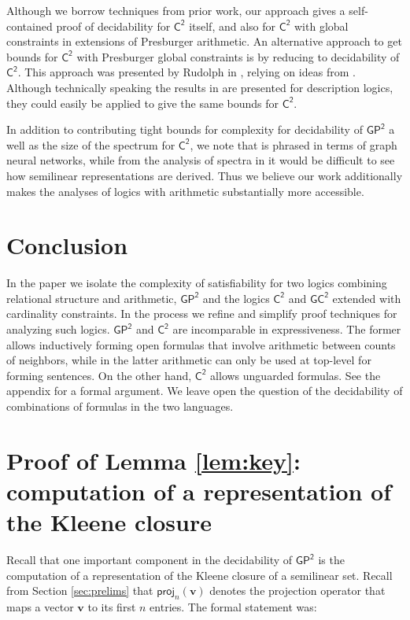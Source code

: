 \documentclass[10pt,a4paper]{article}
\theoremstyle{definition}
\theoremstyle{remark}
\newcommand{\bfv}{\mathbf{v}}
\newcommand{\Ctwo}    {\mathsf{C^2}}
\newcommand{\GCtwo}   {\mathsf{GC^2}}
\newcommand{\GPtwo}   {\mathsf{GP^2}}
\newcommand{\projp}[2]     {\mathsf{proj}_{ #1 }\left( #2 \right)}
\begin{document}
Although we borrow techniques from prior work, our approach gives a self-contained proof of decidability for $\Ctwo$ itself, and also for $\Ctwo$ with global constraints in extensions of Presburger arithmetic. An alternative approach to get bounds for $\Ctwo$ with Presburger global constraints is by reducing to decidability of $\Ctwo$.
This approach was presented by Rudolph in \cite{rudolphcardinality}, relying on ideas from \cite{baadercardinality}. Although technically speaking the results in \cite{rudolphcardinality} are presented for description logics, they could easily be applied to give the same bounds for $\Ctwo$.

In addition to contributing tight bounds for complexity for decidability of $\GPtwo$ a well as the size of the spectrum  for $\Ctwo$, we note that \cite{usicalp} is phrased in terms of graph neural networks, while from the analysis of spectra in \cite{tonyeryk,ultimatelyperiodic} it would be difficult to see how semilinear representations are derived. Thus we believe our work additionally makes the analyses of logics with arithmetic substantially more accessible.


\section{Conclusion} \label{sec:conc}

In the paper we isolate the complexity of satisfiability for two logics combining relational
structure and  arithmetic, $\GPtwo$ and 
the logics $\Ctwo$ and $\GCtwo$ extended with cardinality constraints. In the process we refine and
simplify proof techniques for analyzing such logics.  $\GPtwo$ and $\Ctwo$ are incomparable in expressiveness. The former allows inductively forming open formulas that involve arithmetic between counts of neighbors, while in the latter arithmetic can only be used at top-level for forming sentences. On the other hand, $\Ctwo$ allows unguarded formulas. See the appendix for a formal argument.
We leave open the question of the decidability of combinations of formulas in the two languages. 




\section{Proof of Lemma \ref{lem:key}: computation of a representation of the Kleene closure}

Recall that one important component in the decidability of $\GPtwo$ is the computation of a representation of the Kleene closure of a semilinear set.
Recall from Section \ref{sec:prelims} that $\projp{n}{\bfv}$ denotes the projection operator that maps a vector $\bfv$ to its first $n$ entries.
The formal statement was:
\end{document}
